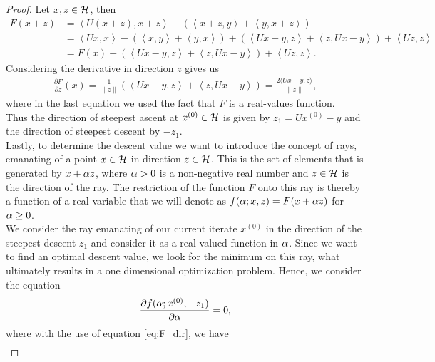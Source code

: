 \begin{proof}
Let $x, z\in \mathcal{H}$, then
\begin{align}\label{eq:F_dir}
F(x + z) &= \left\langle U(x + z), x + z \right\rangle - \left( \left\langle x + z, y \right\rangle + \left\langle y, x + z \right\rangle  \right)\nonumber\\
&= \left\langle Ux, x \right\rangle - \left( \left\langle x, y \right\rangle + \left\langle y, x \right\rangle  \right) + \left( \left\langle Ux - y, z \right\rangle + \left\langle z, Ux - y \right\rangle \right) + \left\langle Uz, z \right\rangle\nonumber\\
&= F(x) + \left( \left\langle Ux - y, z \right\rangle + \left\langle z, Ux - y \right\rangle \right) + \left\langle Uz, z \right\rangle.
\end{align}
Considering the derivative in direction $z$ gives us
\begin{align*}
\frac{\partial F}{\partial z} (x) = \frac{1}{\|z\|} \left(  \left\langle Ux - y, z \right\rangle + \left\langle z, Ux - y \right\rangle \right) = \frac{2 \langle Ux - y, z \rangle}{\|z\|},
\end{align*}
where in the last equation we used the fact that $F$ is a real-values function.\\
Thus the direction of steepest ascent at $x^{(0)}\in\mathcal{H}$ is given by $z_1 = Ux^{(0)} - y$ and the direction of steepest descent by $-z_1$.\\
Lastly, to determine the descent value we want to introduce the concept of rays, emanating of a point $x\in \mathcal{H}$ in direction $z\in\mathcal{H}$. This is the set of elements that is generated by $x + \alpha z$, where $\alpha>0$ is a non-negative real number and $z\in\mathcal{H}$ is the direction of the ray. The restriction of the function $F$ onto this ray is thereby a function of a real variable that we will denote as $f(\alpha; x, z) = F(x + \alpha z)$ for $\alpha \geq 0$.\\
We consider the ray emanating of our current iterate $x^{(0)}$ in the direction of the steepest descent $z_1$ and consider it as a real valued function in $\alpha$. Since we want to find an optimal descent value, we look for the minimum on this ray, what ultimately results in a one dimensional optimization problem. Hence, we consider the equation
\begin{align}\label{eq:deriv_cond}
\frac{\partial f(\alpha; x^{(0)}, - z_1)}{\partial \alpha} = 0,
\end{align}
where with the use of equation \eqref{eq:F_dir}, we have
\begin{align*}

\end{align*}
\end{proof}
